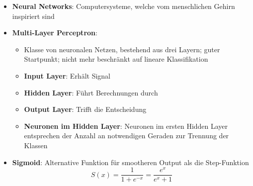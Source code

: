 \begin{itemize}
	\item \textbf{Neural Networks}: Computersysteme, welche vom menschlichen Gehirn inspiriert sind
	\item \textbf{Multi-Layer Perceptron}:
	\begin{itemize}
		\item Klasse von neuronalen Netzen, bestehend aus drei Layern; guter Startpunkt; nicht mehr beschränkt auf lineare Klassifikation
		\item \textbf{Input Layer}: Erhält Signal
		\item \textbf{Hidden Layer}: Führt Berechnungen durch
		\item \textbf{Output Layer}: Trifft die Entscheidung
		\item \textbf{Neuronen im Hidden Layer}: Neuronen im ersten Hidden Layer entsprechen der Anzahl an notwendigen Geraden zur Trennung der Klassen
	\end{itemize}
	\item \textbf{Sigmoid}: Alternative Funktion für smootheren Output als die Step-Funktion
	$$
		S(x) = \frac{1}{1 + e^{-x}} = \frac{e^x}{e^x + 1}
	$$
\end{itemize}
